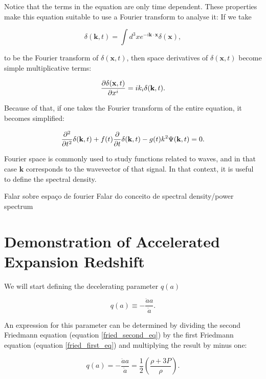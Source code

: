 \documentclass[openany,a4paper,12pt,oneside]{book}
\begin{document}
\begin{spacing}{1.5}
Notice that the terms in the equation are only time dependent. These properties make this equation suitable to use a Fourier transform to analyse it: If we take

\begin{equation}
	\delta(\mathbf{k},t)=\int d^3x e^{-i\mathbf{k}\cdot \mathbf{x}}\delta(\mathbf{x}),
\end{equation}

\noindent to be the Fourier transform of $\delta(\mathbf{x},t)$, then space derivatives of $\delta(\mathbf{x},t)$ become simple multiplicative terms:

\begin{equation}
	\pdv{\delta(\mathbf{x},t)}{x^i}=ik_i\delta(\mathbf{k},t).
\end{equation}

Because of that, if one takes the Fourier transform of the entire equation, it becomes simplified:

\begin{equation}\label{Four_Space:final_eq}
	\pdv[2]{}{t}\delta(\mathbf{k},t)+f(t)\pdv{}{t}\delta(\mathbf{k},t)-g(t)k^2\Psi(\mathbf{k},t)=0.
\end{equation}

Fourier space is commonly used to study functions related to waves, and in that case $\mathbf{k}$ corresponds to the wavevector of that signal. In that context, it is useful to define the spectral density.

Falar sobre espaço de fourier
Falar do conceito de spectral density/power spectrum
\fi

\chapter{Demonstration of Accelerated Expansion Redshift}\label{app:dark_energy_era}

We will start defining the decelerating parameter $q(a)$

\begin{equation}\label{def:decelerating_parameter}
	q(a)\equiv -\frac{\ddot{a}a}{\dot{a}}.
\end{equation} 

An expression for this parameter can be determined by dividing the second Friedmann equation (equation \eqref{fried_second_eq}) by the first Friedmann equation (equation \eqref{fried_first_eq}) and multiplying the result by minus one:

\begin{equation}\label{app_DE:step1}
	q(a)=-\frac{\ddot{a}a}{\dot{a}}=\frac{1}{2}\left(\frac{\rho+3P}{\rho}\right).
\end{equation}


\end{spacing}
\end{document}
